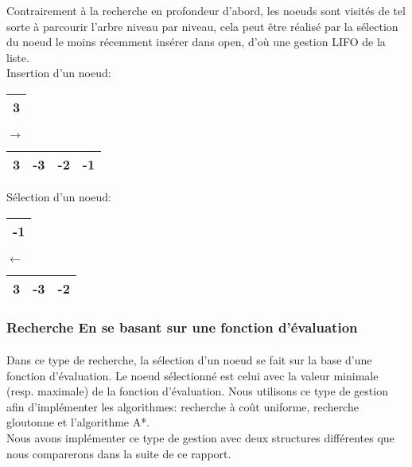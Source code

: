 Contrairement à la recherche en profondeur d’abord, les noeuds sont visités de tel sorte à parcourir l’arbre niveau par niveau, cela peut être réalisé par la sélection du noeud le moins récemment insérer dans open, d’où une gestion LIFO de la liste.\\
Insertion d'un noeud:\\
\begin{minipage}{0.5\textwidth}
	\centering
	\begin{tabular}{|c |}
		\hline
		3 \\
		\hline
	\end{tabular}
\end{minipage}
\hfillx
$\rightarrow$
\begin{minipage}{0.5\textwidth}
	\centering
	\begin{tabular}{|c | c| c| c|}
		\hline
		{\color{red}3} & -3 & -2 & -1 \\\hline
	\end{tabular}
\end{minipage}

Sélection d'un noeud:\\
\begin{minipage}{0.5\textwidth}
	\centering
	\begin{tabular}{|c |}
		\hline
		{\color{red}-1} \\
		\hline
	\end{tabular}
\end{minipage}
\hfillx
$\leftarrow$
\begin{minipage}{0.5\textwidth}
	\centering
	\begin{tabular}{| c| c| c|}
		\hline
		3 & -3 & -2  \\\hline
	\end{tabular}
\end{minipage}

\subsubsection{Recherche En se basant sur une fonction d'évaluation}
\paragraph{}
Dans ce type de recherche, la sélection d’un noeud se fait sur la base d’une fonction d’évaluation. Le noeud sélectionné est celui avec la valeur minimale (resp. maximale) de la fonction d’évaluation. Nous utilisons ce type de gestion afin d’implémenter les algorithmes: recherche à coût uniforme, recherche gloutonne et l’algorithme A*.\\
Nous avons implémenter ce type de gestion avec deux structures différentes que nous comparerons dans la suite de ce rapport.
